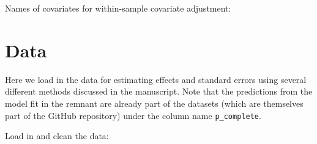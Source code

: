 \documentclass[12pt]{article}
\begin{document}
Names of covariates for within-sample covariate adjustment:
\begin{knitrout}
\color{fgcolor}\begin{kframe}
\begin{alltt}
 \hlkwb{<-} \hlstd{(}
    \hlstd{,}
    \hlstd{,}
    \hlstd{,}
    \hlstd{,}
    \hlstd{,}
    \hlstd{,}
    \hlstd{,}
    \hlstd{,}
    \hlstd{,}
    \hlstd{)}\hlcom{#)}
\end{alltt}
\end{kframe}
\end{knitrout}

\section{Data}

Here we load in the data for estimating effects and standard errors
using several different methods discussed in the manuscript.
Note that the predictions from the model fit in the remnant are
already part of the datasets (which are themselves part of the GitHub
repository) under the column name \texttt{p\_complete}.

Load in and clean the data:\\
\end{document}
